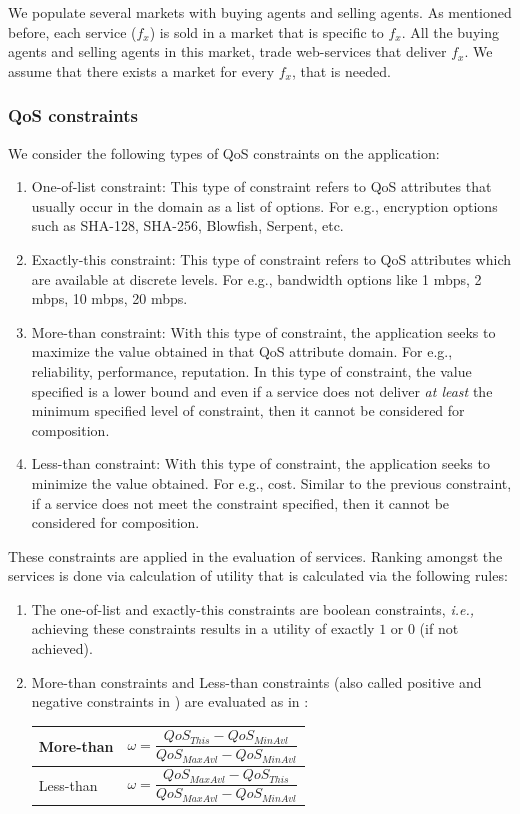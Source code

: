 \documentclass[10pt,journal,compsoc]{IEEEtran}
\begin{document}
We populate several markets with buying agents and selling agents. As mentioned before, each service ($f_{x}$) is sold in a market that is specific to $f_{x}$. All the buying agents and selling agents in this market, trade web-services that deliver $f_{x}$. We assume that there exists a market for every $f_x$, that is needed.  

\subsubsection{QoS constraints}
We consider the following types of QoS constraints on the application:
\begin{enumerate}
\item One-of-list constraint: This type of constraint refers to QoS attributes that usually occur in the domain as a list of options. For e.g., encryption options such as SHA-128, SHA-256, Blowfish, Serpent, etc.
\item Exactly-this constraint: This type of constraint refers to QoS attributes which are available at discrete levels. For e.g., bandwidth options like 1 mbps, 2 mbps, 10 mbps, 20 mbps.
\item More-than constraint: With this type of constraint, the application seeks to maximize the value obtained in that QoS attribute domain. For e.g., reliability, performance, reputation. In this type of constraint, the value specified is a lower bound and even if a service does not deliver \textit{at least} the minimum specified level of constraint, then it cannot be considered for composition.
\item Less-than constraint: With this type of constraint, the application seeks to minimize the value obtained. For e.g., cost. Similar to the previous constraint, if a service does not meet the constraint specified, then it cannot be considered for composition.
\end{enumerate}
These constraints are applied in the evaluation of services. Ranking amongst the services is done via calculation of utility that is calculated via the following rules:
\begin{enumerate}
\item The one-of-list and exactly-this constraints are boolean constraints, \textit{i.e.,} achieving these constraints results in a utility of exactly $1$ or $0$ (if not achieved). 
\item More-than constraints and Less-than constraints (also called positive and negative constraints in \cite{Ardagna2007Adaptive}) are evaluated as in \cite{Ardagna2007Adaptive}: 
\hspace{1cm}
\begin{table}[h]
\begin{tabular}{|p{1cm}p{5cm}|}
\hline
More-than & \[ \omega = \frac{QoS_{This} - QoS_{MinAvl}}{QoS_{MaxAvl} - QoS_{MinAvl}} \] \\
\hline
Less-than & \[ \omega = \frac{QoS_{MaxAvl} - QoS_{This}}{QoS_{MaxAvl} - QoS_{MinAvl}} \] \\
\hline
\end{tabular}
\end{table}
\end{enumerate}
\end{document}
